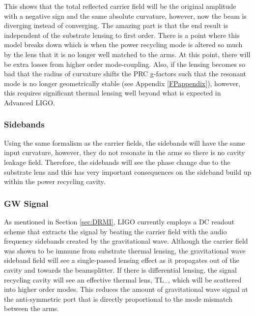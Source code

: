 		This shows that the total reflected carrier field will be the original amplitude with a negative sign and the same absolute curvature, however, now the beam is diverging instead of converging.  The amazing part is that the end result is independent of the substrate lensing to first order.  There is a point where this model breaks down which is when the power recycling mode is altered so much by the lens that it is no longer well matched to the arms.  At this point, there will be extra losses from higher order mode-coupling.  Also, if the lensing becomes so bad that the radius of curvature shifts the PRC g-factors such that the resonant mode is no longer geometrically stable (see Appendix \ref{FPappendix}), however, this requires significant thermal lensing well beyond what is expected in Advanced LIGO.
		
		\subsubsection{Sidebands}
		Using the same formalism as the carrier fields, the sidebands will have the same input curvature, however, they do not resonate in the arms so there is no cavity leakage field.  Therefore, the sidebands will see the phase change due to the substrate lens and this has very important consequences on the sideband build up within the power recycling cavity.
		
		\subsubsection{GW Signal}
		As mentioned in Section \ref{sec:DRMI}, LIGO currently employs a DC readout scheme that extracts the signal by beating the carrier field with the audio frequency sidebands created by the gravitational wave.  Although the carrier field was shown to be immune from substrate thermal lensing, the gravitational wave sideband field will see a single-passed lensing effect as it propagates out of the cavity and towards the beamsplitter.  If there is differential lensing, the signal recycling cavity will see an effective thermal lens, $\text{TL}_{-}$, which will be scattered into higher order modes.  This reduces the amount of gravitational wave signal at the anti-symmetric port that is directly proportional to the mode mismatch between the arms.
	
	
	
